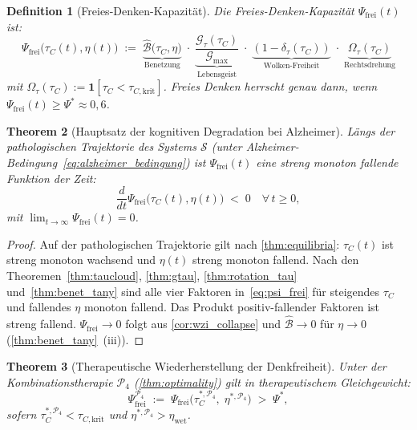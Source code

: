 ﻿\documentclass[12pt,a4paper]{article}
\newtheorem{theorem}{Theorem}[section]
\newtheorem{definition}[theorem]{Definition}
\theoremstyle{definition}
\begin{document}
	\begin{definition}[Freies-Denken-Kapazität]
		\label{def:psi_frei}
		Die \emph{Freies-Denken-Kapazität} $\Psi_{\mathrm{frei}}(t)$ ist:
		\begin{equation}
			\boxed{
			\Psi_{\mathrm{frei}}\bigl(\tau_C(t), \eta(t)\bigr)
			\;:=\;
			\underbrace{\hat{\mathcal{B}}\bigl(\tau_C, \eta\bigr)}_{\text{Benetzung}}
			\;\cdot\;
			\underbrace{\dfrac{\mathcal{G}_\tau(\tau_C)}{\mathcal{G}_{\max}}}_{\text{Lebensgeist}}
			\;\cdot\;
			\underbrace{(1 - \delta_\tau(\tau_C))}_{\text{Wolken-Freiheit}}
			\;\cdot\;
			\underbrace{\Omega_\tau(\tau_C)}_{\text{Rechtsdrehung}}
			}
			\label{eq:psi_frei}
		\end{equation}
		mit $\Omega_\tau(\tau_C) := \mathbf{1}[\tau_C < \tau_{C,\mathrm{krit}}]$.
		Freies Denken herrscht genau dann, wenn $\Psi_{\mathrm{frei}}(t) \geq \Psi^* \approx 0{,}6$.
	\end{definition}

	\begin{theorem}[Hauptsatz der kognitiven Degradation bei Alzheimer]
		\label{thm:hauptsatz}
		Längs der pathologischen Trajektorie des Systems $\mathcal{S}$ (unter
		Alzheimer-Bedingung~\eqref{eq:alzheimer_bedingung}) ist $\Psi_{\mathrm{frei}}(t)$
		eine streng monoton fallende Funktion der Zeit:
		\[
			\frac{d}{dt}\Psi_{\mathrm{frei}}\bigl(\tau_C(t), \eta(t)\bigr) \;<\; 0
			\quad \forall\, t \geq 0,
		\]
		mit $\lim_{t \to \infty} \Psi_{\mathrm{frei}}(t) = 0$.
	\end{theorem}

	\begin{proof}
		Auf der pathologischen Trajektorie gilt nach \cref{thm:equilibria}:
		$\tau_C(t)$ ist streng monoton wachsend und $\eta(t)$ streng monoton fallend.
		Nach den Theoremen~\ref{thm:taucloud}, \ref{thm:gtau}, \ref{thm:rotation_tau}
		und~\ref{thm:benet_tany} sind alle vier Faktoren in~\eqref{eq:psi_frei}
		für steigendes $\tau_C$ und fallendes $\eta$ monoton fallend.
		Das Produkt positiv-fallender Faktoren ist streng fallend.
		$\Psi_{\mathrm{frei}} \to 0$ folgt aus \cref{cor:wzi_collapse} und
		$\hat{\mathcal{B}} \to 0$ für $\eta \to 0$ (\cref{thm:benet_tany}~(iii)).
	\end{proof}

	\begin{theorem}[Therapeutische Wiederherstellung der Denkfreiheit]
		\label{thm:psi_therapie}
		Unter der Kombinationstherapie $\mathcal{P}_4$ (\cref{thm:optimality}) gilt in
		therapeutischem Gleichgewicht:
		\[
			\Psi_{\mathrm{frei}}^{\mathcal{P}_4}
			\;:=\; \Psi_{\mathrm{frei}}\!\bigl(\tau_C^{*,\mathcal{P}_4},\;\eta^{*,\mathcal{P}_4}\bigr)
			\;>\; \Psi^*,
		\]
		sofern
		$\tau_C^{*,\mathcal{P}_4} < \tau_{C,\mathrm{krit}}$
		und
		$\eta^{*,\mathcal{P}_4} > \eta_{\mathrm{wet}}$.
	\end{theorem}
\end{document}
